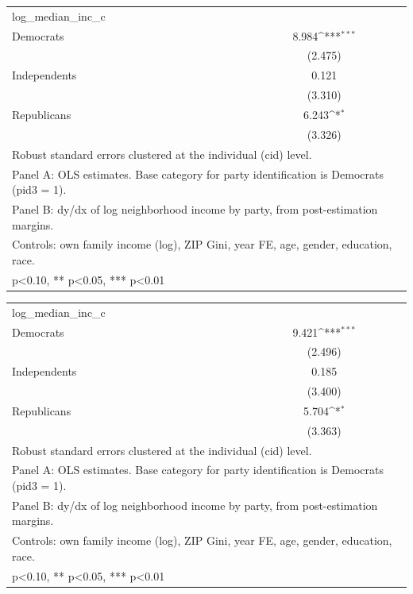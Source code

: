 {
\def\sym#1{\ifmmode^{#1}\else\(^{#1}\)\fi}
\begin{tabular}{l*{1}{c}}
\toprule
\midrule
log\_median\_inc\_c&                     \\
Democrats   &       8.984\sym{***}\\
            &     (2.475)         \\
Independents&       0.121         \\
            &     (3.310)         \\
Republicans &       6.243\sym{*}  \\
            &     (3.326)         \\
\bottomrule
\multicolumn{2}{l}{\footnotesize Robust standard errors clustered at the individual (cid) level.}\\
\multicolumn{2}{l}{\footnotesize Panel A: OLS estimates. Base category for party identification is Democrats (pid3 = 1).}\\
\multicolumn{2}{l}{\footnotesize Panel B: dy/dx of log neighborhood income by party, from post-estimation margins.}\\
\multicolumn{2}{l}{\footnotesize Controls: own family income (log), ZIP Gini, year FE, age, gender, education, race.}\\
\multicolumn{2}{l}{\footnotesize * p<0.10, ** p<0.05, *** p<0.01}\\
\end{tabular}
}
{
\def\sym#1{\ifmmode^{#1}\else\(^{#1}\)\fi}
\begin{tabular}{l*{1}{c}}
\toprule
\midrule
log\_median\_inc\_c&                     \\
Democrats   &       9.421\sym{***}\\
            &     (2.496)         \\
Independents&       0.185         \\
            &     (3.400)         \\
Republicans &       5.704\sym{*}  \\
            &     (3.363)         \\
\bottomrule
\multicolumn{2}{l}{\footnotesize Robust standard errors clustered at the individual (cid) level.}\\
\multicolumn{2}{l}{\footnotesize Panel A: OLS estimates. Base category for party identification is Democrats (pid3 = 1).}\\
\multicolumn{2}{l}{\footnotesize Panel B: dy/dx of log neighborhood income by party, from post-estimation margins.}\\
\multicolumn{2}{l}{\footnotesize Controls: own family income (log), ZIP Gini, year FE, age, gender, education, race.}\\
\multicolumn{2}{l}{\footnotesize * p<0.10, ** p<0.05, *** p<0.01}\\
\end{tabular}
}
